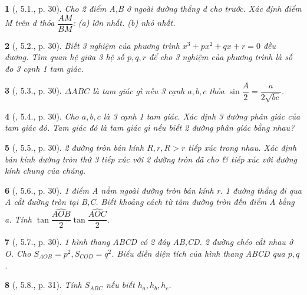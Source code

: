 \documentclass{article}
\newtheorem{baitoan}{}
\begin{document}
\begin{baitoan}[\cite{Hai_Hung_Thu_Tung2022_tap_1}, 5.1., p. 30]
	Cho 2 điểm A,B ở ngoài đường thẳng d cho trước. Xác định điểm M trên d thỏa $\dfrac{AM}{BM}$: (a) lớn nhất. (b) nhỏ nhất.
\end{baitoan}

\begin{baitoan}[\cite{Hai_Hung_Thu_Tung2022_tap_1}, 5.2., p. 30]
	Biết 3 nghiệm của phương trình $x^3 + px^2 + qx + r = 0$ đều dương. Tìm quan hệ giữa 3 hệ số $p,q,r$ để cho 3 nghiệm của phương trình là số đo 3 cạnh 1 tam giác.
\end{baitoan}

\begin{baitoan}[\cite{Hai_Hung_Thu_Tung2022_tap_1}, 5.3., p. 30]
	$\Delta ABC$ là tam giác gì nếu 3 cạnh $a,b,c$ thỏa $\sin\dfrac{A}{2} = \dfrac{a}{2\sqrt{bc}}$.
\end{baitoan}

\begin{baitoan}[\cite{Hai_Hung_Thu_Tung2022_tap_1}, 5.4., p. 30]
	Cho $a,b,c$ là 3 cạnh 1 tam giác. Xác định 3 đường phân giác của tam giác đó. Tam giác đó là tam giác gì nếu biết 2 đường phân giác bằng nhau?
\end{baitoan}

\begin{baitoan}[\cite{Hai_Hung_Thu_Tung2022_tap_1}, 5.5., p. 30]
	2 đường tròn bán kính $R,r,R > r$ tiếp xúc trong nhau. Xác định bán kính đường tròn thứ 3 tiếp xúc với 2 đường tròn đã cho \& tiếp xúc với đường kính chung của chúng.
\end{baitoan}

\begin{baitoan}[\cite{Hai_Hung_Thu_Tung2022_tap_1}, 5.6., p. 30]
	1 điểm A nằm ngoài đường tròn bán kính r. 1 đường thẳng đi qua A cắt đường tròn tại B,C. Biết khoảng cách từ tâm đường tròn đến điểm A bằng a. Tính $\tan\dfrac{\widehat{AOB}}{2}\tan\dfrac{\widehat{AOC}}{2}$.
\end{baitoan}

\begin{baitoan}[\cite{Hai_Hung_Thu_Tung2022_tap_1}, 5.7., p. 30]
	1 hình thang ABCD có 2 đáy AB,CD. 2 đường chéo cắt nhau ở O. Cho $S_{AOB} = p^2,S_{COD} = q^2$. Biểu diễn diện tích của hình thang ABCD qua $p,q$.
\end{baitoan}

\begin{baitoan}[\cite{Hai_Hung_Thu_Tung2022_tap_1}, 5.8., p. 31]
	Tính $S_{ABC}$ nếu biết $h_a,h_b,h_c$.
\end{baitoan}
\end{document}
